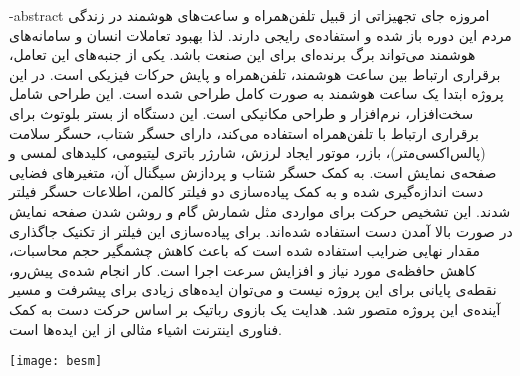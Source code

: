 
\fa-abstract{
امروزه جای تجهیزاتی از قبیل تلفن‌همراه و ساعت‌های هوشمند در زندگی مردم این دوره باز شده و استفاده‌ی رایجی دارند. لذا بهبود تعاملات انسان و سامانه‌های هوشمند می‌تواند برگ برنده‌ای برای این صنعت باشد. یکی از جنبه‌های این تعامل، برقراری ارتباط بین ساعت هوشمند، تلفن‌همراه و پایش حرکات فیزیکی است. در این پروژه ابتدا یک ساعت هوشمند به صورت کامل طراحی شده است. این طراحی شامل سخت‌افزار، نرم‌افزار و طراحی مکانیکی است. این دستگاه از بستر بلوتوث برای برقراری ارتباط با تلفن‌همراه استفاده می‌کند، دارای حسگر شتاب،‌ حسگر سلامت (پالس‌اکسی‌متر)، بازر، موتور ایجاد لرزش، شارژر باتری لیتیومی، کلیدهای لمسی و صفحه‌ی نمایش است. به کمک حسگر شتاب و پردازش سیگنال آن، متغیرهای فضایی دست اندازه‌گیری شده و به کمک پیاده‌سازی دو فیلتر کالمن، اطلاعات حسگر فیلتر شدند. این تشخیص حرکت برای مواردی مثل شمارش گام و روشن شدن صفحه نمایش در صورت بالا آمدن دست استفاده شده‌اند. برای پیاده‌سازی این فیلتر از تکنیک جاگذاری مقدار نهایی ضرایب استفاده شده است که باعث کاهش چشمگیر حجم محاسبات، کاهش حافظه‌ی مورد نیاز و افزایش سرعت اجرا است. کار انجام شده‌ی پیش‌رو، نقطه‌ی پایانی برای این پروژه نیست و می‌توان ایده‌های زیادی برای پیشرفت و مسیر آینده‌ی این پروژه متصور شد. هدایت یک بازوی رباتیک بر اساس حرکت دست به کمک فناوری اینترنت اشیاء مثالی از این ایده‌ها است.
}





\AUTtitle
\vspace*{7cm}
\thispagestyle{empty}
\begin{center}
\texttt{[image: besm]}
\end{center}